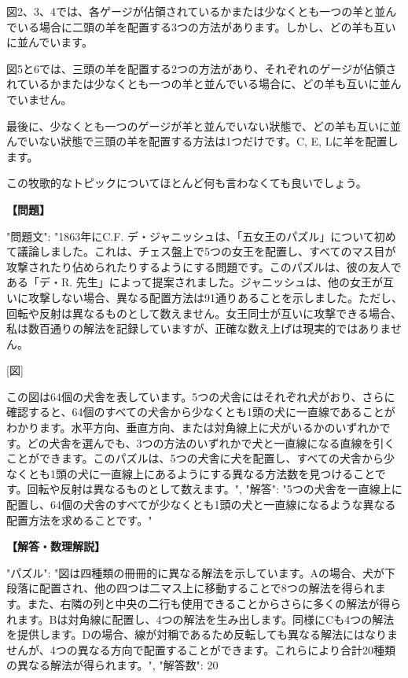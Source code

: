 \documentclass[10pt,a4paper,oneside,openany]{ltjsbook}
\begin{document}
\begin{tcolorbox}[colback=softblue,colframe=primaryblue,title=\textbf{第 310 問：THE THREE SHEEP.},arc=2mm,boxrule=1pt,breakable]
図2、3、4では、各ゲージが佔領されているかまたは少なくとも一つの羊と並んでいる場合に二頭の羊を配置する3つの方法があります。しかし、どの羊も互いに並んでいます。

図5と6では、三頭の羊を配置する2つの方法があり、それぞれのゲージが佔領されているかまたは少なくとも一つの羊と並んでいる場合に、どの羊も互いに並んでいません。

最後に、少なくとも一つのゲージが羊と並んでいない狀態で、どの羊も互いに並んでいない狀態で三頭の羊を配置する方法は1つだけです。C, E, Lに羊を配置します。

この牧歌的なトピックについてほとんど何も言わなくても良いでしょう。
\end{tcolorbox}

\begin{tcolorbox}[colback=softblue,colframe=primaryblue,title=\textbf{第 311 問：THE FIVE DOGS PUZZLE.},arc=2mm,boxrule=1pt,breakable]
\textbf{【問題】}\par\vspace{0.3em}
{
"問題文": "1863年にC.F. デ・ジャニッシュは、「五女王のパズル」について初めて議論しました。これは、チェス盤上で5つの女王を配置し、すべてのマス目が攻撃されたり佔められたりするようにする問題です。このパズルは、彼の友人である「デ・R. 先生」によって提案されました。ジャニッシュは、他の女王が互いに攻撃しない場合、異なる配置方法は91通りあることを示しました。ただし、回転や反射は異なるものとして数えません。女王同士が互いに攻撃できる場合、私は数百通りの解法を記録していますが、正確な数え上げは現実的ではありません。

[図]

この図は64個の犬舎を表しています。5つの犬舎にはそれぞれ犬がおり、さらに確認すると、64個のすべての犬舎から少なくとも1頭の犬に一直線であることがわかります。水平方向、垂直方向、または対角線上に犬がいるかのいずれかです。どの犬舎を選んでも、3つの方法のいずれかで犬と一直線になる直線を引くことができます。このパズルは、5つの犬舎に犬を配置し、すべての犬舎から少なくとも1頭の犬に一直線上にあるようにする異なる方法数を見つけることです。回転や反射は異なるものとして数えます。",
"解答": "5つの犬舎を一直線上に配置し、64個の犬舎のすべてが少なくとも1頭の犬と一直線になるような異なる配置方法を求めることです。"
}
\tcblower
\textbf{【解答・数理解説】}\par\vspace{0.3em}
{
"パズル": "図は四種類の冊冊的に異なる解法を示しています。Aの場合、犬が下段落に配置され、他の四つは二マス上に移動することで8つの解法を得られます。また、右隣の列と中央の二行も使用できることからさらに多くの解法が得られます。Bは対角線に配置し、4つの解法を生み出します。同様にCも4つの解法を提供します。Dの場合、線が対稱であるため反転しても異なる解法にはなりませんが、4つの異なる方向で配置することができます。これらにより合計20種類の異なる解法が得られます。",
"解答数": 20
}
\end{tcolorbox}
\end{document}
